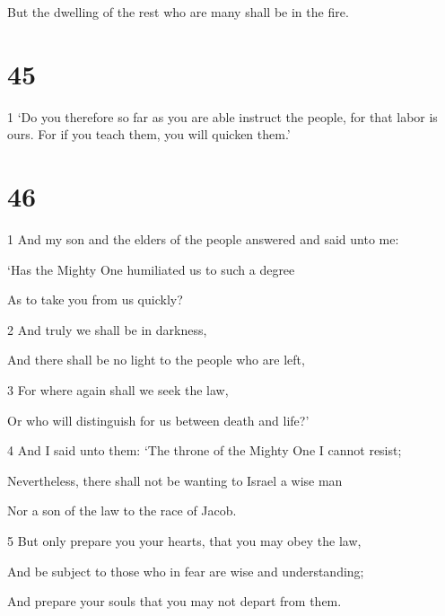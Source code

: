 \par But the dwelling of the rest who are many shall be in the fire.

\chapter{45}

\par 1 ‘Do you therefore so far as you are able instruct the people, for that labor is ours. For if you teach them, you will quicken them.’

\chapter{46}

\par 1 And my son and the elders of the people answered and said unto me:

\par ‘Has the Mighty One humiliated us to such a degree

\par As to take you from us quickly?

\par 2 And truly we shall be in darkness,

\par And there shall be no light to the people who are left,

\par 3 For where again shall we seek the law,

\par Or who will distinguish for us between death and life?’

\par 4 And I said unto them: ‘The throne of the Mighty One I cannot resist;

\par Nevertheless, there shall not be wanting to Israel a wise man

\par Nor a son of the law to the race of Jacob.

\par 5 But only prepare you your hearts, that you may obey the law,

\par And be subject to those who in fear are wise and understanding;

\par And prepare your souls that you may not depart from them.

